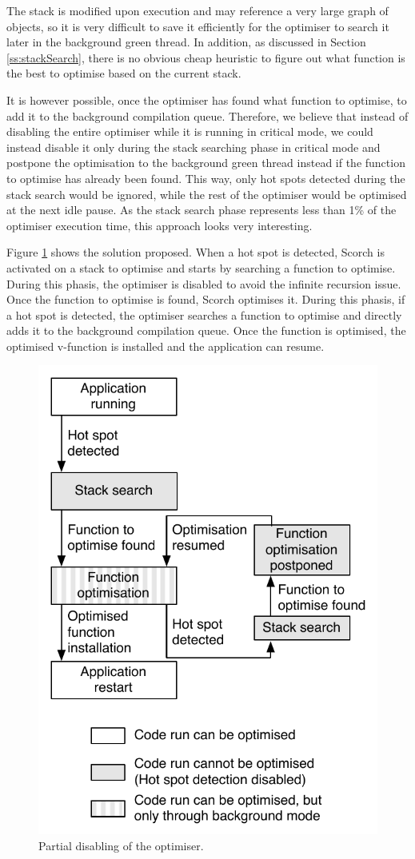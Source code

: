 \documentclass[a4paper,12pt,twoside]{../includes/ThesisStyle}
\begin{document}
The stack is modified upon execution and may reference a very large graph of objects, so it is very difficult to save it efficiently for the optimiser to search it later in the background green thread. In addition, as discussed in Section \ref{ss:stackSearch}, there is no obvious cheap heuristic to figure out what function is the best to optimise based on the current stack. 

It is however possible, once the optimiser has found what function to optimise, to add it to the background compilation queue. Therefore, we believe that instead of disabling the entire optimiser while it is running in critical mode, we could instead disable it only during the stack searching phase in critical mode and postpone the optimisation to the background green thread instead if the function to optimise has already been found. This way, only hot spots detected during the stack search would be ignored, while the rest of the optimiser would be optimised at the next idle pause. As the stack search phase represents less than 1\% of the optimiser execution time, this approach looks very interesting.

Figure \ref{fig:PartialDisabling} shows the solution proposed. When a hot spot is detected, Scorch is activated on a stack to optimise and starts by searching a function to optimise. During this phasis, the optimiser is disabled to avoid the infinite recursion issue. Once the function to optimise is found, Scorch optimises it. During this phasis, if a hot spot is detected, the optimiser searches a function to optimise and directly adds it to the background compilation queue. Once the function is optimised, the optimised v-function is installed and the application can resume.

\begin{figure}[h!]
    \begin{center}
        \includegraphics[width=0.55\linewidth]{PartialDisabling}
        \caption{Partial disabling of the optimiser.}
        \label{fig:PartialDisabling}
    \end{center}
\end{figure}
\end{document}
